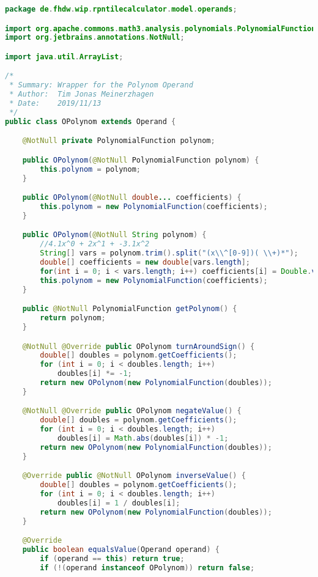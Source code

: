 \begin{lstlisting}[caption=OPolynom (Meinerzhagen),label=list:OPolynom,language=Java]
package de.fhdw.wip.rpntilecalculator.model.operands;

import org.apache.commons.math3.analysis.polynomials.PolynomialFunction;
import org.jetbrains.annotations.NotNull;

import java.util.ArrayList;

/*
 * Summary: Wrapper for the Polynom Operand
 * Author:  Tim Jonas Meinerzhagen
 * Date:    2019/11/13
 */
public class OPolynom extends Operand {

    @NotNull private PolynomialFunction polynom;

    public OPolynom(@NotNull PolynomialFunction polynom) {
        this.polynom = polynom;
    }

    public OPolynom(@NotNull double... coefficients) {
        this.polynom = new PolynomialFunction(coefficients);
    }

    public OPolynom(@NotNull String polynom) {
        //4.1x^0 + 2x^1 + -3.1x^2
        String[] vars = polynom.trim().split("(x\\^[0-9])( \\+)*");
        double[] coefficients = new double[vars.length];
        for(int i = 0; i < vars.length; i++) coefficients[i] = Double.valueOf(vars[i].trim());
        this.polynom = new PolynomialFunction(coefficients);
    }

    public @NotNull PolynomialFunction getPolynom() {
        return polynom;
    }

    @NotNull @Override public OPolynom turnAroundSign() {
        double[] doubles = polynom.getCoefficients();
        for (int i = 0; i < doubles.length; i++)
            doubles[i] *= -1;
        return new OPolynom(new PolynomialFunction(doubles));
    }

    @NotNull @Override public OPolynom negateValue() {
        double[] doubles = polynom.getCoefficients();
        for (int i = 0; i < doubles.length; i++)
            doubles[i] = Math.abs(doubles[i]) * -1;
        return new OPolynom(new PolynomialFunction(doubles));
    }

    @Override public @NotNull OPolynom inverseValue() {
        double[] doubles = polynom.getCoefficients();
        for (int i = 0; i < doubles.length; i++)
            doubles[i] = 1 / doubles[i];
        return new OPolynom(new PolynomialFunction(doubles));
    }

    @Override
    public boolean equalsValue(Operand operand) {
        if (operand == this) return true;
        if (!(operand instanceof OPolynom)) return false;


\end{lstlisting}
